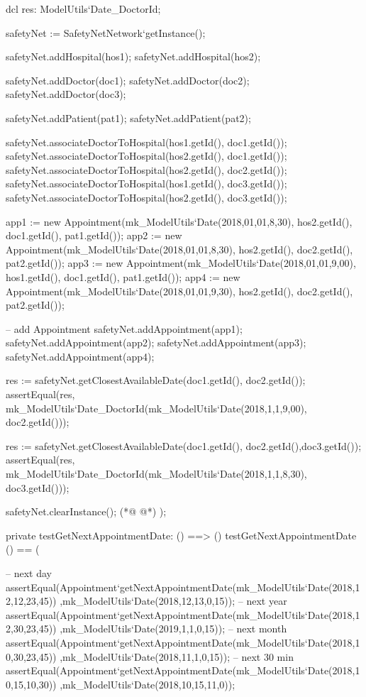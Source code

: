 \begin{vdmpp}[breaklines=true]
  dcl res: ModelUtils`Date_DoctorId;
  
  safetyNet := SafetyNetNetwork`getInstance();
   
  safetyNet.addHospital(hos1);
  safetyNet.addHospital(hos2);
  
  safetyNet.addDoctor(doc1);
  safetyNet.addDoctor(doc2);
  safetyNet.addDoctor(doc3);
  
  safetyNet.addPatient(pat1);
  safetyNet.addPatient(pat2);

  safetyNet.associateDoctorToHospital(hos1.getId(), doc1.getId());
  safetyNet.associateDoctorToHospital(hos2.getId(), doc1.getId());
  safetyNet.associateDoctorToHospital(hos2.getId(), doc2.getId());
  safetyNet.associateDoctorToHospital(hos1.getId(), doc3.getId());
  safetyNet.associateDoctorToHospital(hos2.getId(), doc3.getId());
  
    
  app1 := new Appointment(mk_ModelUtils`Date(2018,01,01,8,30), hos2.getId(), doc1.getId(), pat1.getId());
  app2 := new Appointment(mk_ModelUtils`Date(2018,01,01,8,30), hos2.getId(), doc2.getId(), pat2.getId());
  app3 := new Appointment(mk_ModelUtils`Date(2018,01,01,9,00), hos1.getId(), doc1.getId(), pat1.getId());
  app4 := new Appointment(mk_ModelUtils`Date(2018,01,01,9,30), hos2.getId(), doc2.getId(), pat2.getId());

    
  -- add Appointment
  safetyNet.addAppointment(app1);
  safetyNet.addAppointment(app2);
  safetyNet.addAppointment(app3);
  safetyNet.addAppointment(app4);
 
 
  res := safetyNet.getClosestAvailableDate({doc1.getId(), doc2.getId()}); 
  assertEqual(res, mk_ModelUtils`Date_DoctorId(mk_ModelUtils`Date(2018,1,1,9,00), doc2.getId()));
  
  res := safetyNet.getClosestAvailableDate({doc1.getId(), doc2.getId(),doc3.getId()}); 
  assertEqual(res, mk_ModelUtils`Date_DoctorId(mk_ModelUtils`Date(2018,1,1,8,30), doc3.getId()));
  
  
  safetyNet.clearInstance(); 
(*@
\label{testGetNextAppointmentDate:964}
@*)
);


private testGetNextAppointmentDate: () ==> ()
 testGetNextAppointmentDate () == (
 
  -- next day
  assertEqual(Appointment`getNextAppointmentDate(mk_ModelUtils`Date(2018,12,12,23,45)) ,mk_ModelUtils`Date(2018,12,13,0,15));
  -- next year
  assertEqual(Appointment`getNextAppointmentDate(mk_ModelUtils`Date(2018,12,30,23,45)) ,mk_ModelUtils`Date(2019,1,1,0,15));
  -- next month
  assertEqual(Appointment`getNextAppointmentDate(mk_ModelUtils`Date(2018,10,30,23,45)) ,mk_ModelUtils`Date(2018,11,1,0,15));
  -- next 30 min
  assertEqual(Appointment`getNextAppointmentDate(mk_ModelUtils`Date(2018,10,15,10,30)) ,mk_ModelUtils`Date(2018,10,15,11,0));
 

\end{vdmpp}
